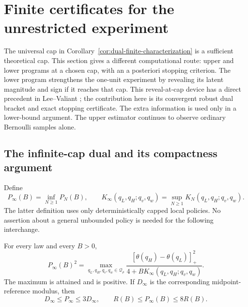 \section{Finite certificates for the unrestricted experiment}
\label{sec:genie}

The universal cap in Corollary~\ref{cor:dual-finite-characterization} is a
sufficient theoretical cap. This section gives a different computational
route: upper and lower programs at a chosen cap, with an a posteriori
stopping criterion. The lower program strengthens the one-unit experiment
by revealing its latent magnitude and sign if it reaches that cap.
This reveal-at-cap device has a direct precedent in Lee--Valiant
\cite[Section 5.2]{lv}; the contribution here is its convergent robust
dual bracket and exact stopping certificate. The extra information is
used only in a lower-bound argument. The upper
estimator continues to observe ordinary Bernoulli samples alone.

\subsection{The infinite-cap dual and its compactness argument}

Define
\[
 P_\infty(B)=\inf_{N\ge1}P_N(B),\qquad
 K_\infty(q_L,q_H;q_v,q_w)=\sup_{N\ge1}K_N(q_L,q_H;q_v,q_w).
\]
The latter definition uses only deterministically capped local policies.
No assertion about a general unbounded policy is needed for the following
interchange.

\begin{lemma}\label{lem:infinite-dual}
For every law and every $B>0$,
\begin{equation}\label{eq:infinite-dual}
 P_\infty(B)^2
 =\max_{q_L,q_H,q_v,q_w\in\mathcal Q_\rho}
 \frac{[\theta(q_H)-\theta(q_L)]_+^2}{4+B K_\infty(q_L,q_H;q_v,q_w)}.
\end{equation}
The maximum is attained and is positive. If $D_\infty$ is the corresponding
midpoint-reference modulus, then
\begin{equation}\label{eq:infinite-comparison}
 D_\infty\le P_\infty\le3D_\infty,
 \qquad R(B)\le P_\infty(B)\le8R(B).
\end{equation}
\end{lemma}

